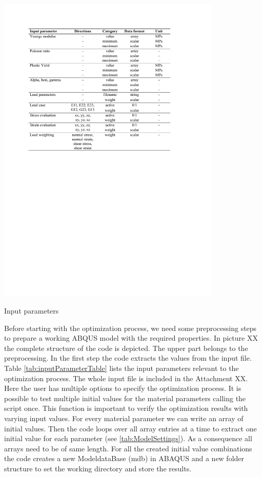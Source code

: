     \begin{table}[H]
		\centering
        \includegraphics[width=0.8\textwidth]{inputParameterTable.pdf}
		\caption{Input parameters}
		\label{tab:inputParameterTable}
	\end{table}
    
    Before starting with the optimization process, we need some preprocessing steps to prepare a working ABQUS model with the required properties. In picture XX the complete structure of the code is depicted. The upper part belongs to the preprocessing. In the first step the code extracts the values from the input file. Table \autoref{tab:inputParameterTable} lists the input parameters relevant to the optimization process. The whole input file is included in the Attachment XX. Here the user has multiple options to specify the optimization process. It is possible to test multiple initial values for the material parameters calling the script once. This function is important to verify the optimization results with varying input values. For every material parameter we can write an array of initial values. Then the code loops over all array entries at a time to extract one initial value for each parameter (see \autoref{tab:ModelSettings}). As a consequence all arrays need to be of same length. For all the created initial value combinations the code creates a new ModeldataBase (mdb) in ABAQUS and a new folder structure to set the working directory and store the results.
   
